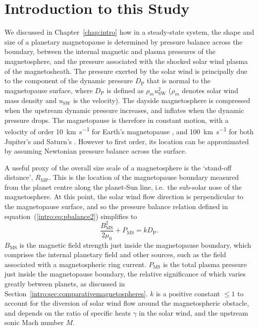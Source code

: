 \section{Introduction to this Study}\label{compress:sec:intro}
We discussed in Chapter~\ref{chap:intro} how in a steady-state system, the shape and size of a planetary magnetopause is determined by pressure balance across the boundary, between the internal magnetic and plasma pressures of the magnetosphere, and the pressure associated with the shocked solar wind plasma of the magnetosheath. The pressure exerted by the solar wind is principally due to the component of the dynamic pressure $D_\mathrm{P}$ that is normal to the magnetopause surface, where $D_\mathrm{P}$ is defined as $\rho_mu_\mathrm{SW}^2$ ($\rho_m$ denotes solar wind mass density and $u_\mathrm{SW}$ is the velocity). The dayside magnetosphere is compressed when the upstream dynamic pressure increases, and inflates when the dynamic pressure drops. The magnetopause is therefore in constant motion, with a velocity of order {\SI{10}{km s^{-1}}} for Earth's magnetopause {\citep{berchem1982}}, and {\SI{100}{km s^{-1}}} for both Jupiter's \citep{bame1992} and Saturn's {\citep{masters2011}}. However to first order, its location can be approximated by assuming Newtonian pressure balance across the surface. 

A useful proxy of the overall size scale of a magnetosphere is the `stand-off distance', $R_\mathrm{MP}$. This is the location of the magnetopause boundary measured from the planet centre along the planet-Sun line, i.e.\ the sub-solar nose of the magnetosphere. At this point, the solar wind flow direction is perpendicular to the magnetopause surface, and so the pressure balance relation defined in equation~(\ref{intro:eq:pbalance2}) simplifies to
\begin{equation}\label{compress:eq:pbalance}
\frac{B_{\mathrm{MS}}^2}{2\mu_0} + P_{\mathrm{MS}} = kD_\mathrm{P}.
\end{equation}
$B_\mathrm{MS}$ is the magnetic field strength just inside the magnetopause boundary, which comprises the internal planetary field and other sources, such as the field associated with a magnetospheric ring current. $P_{\mathrm{MS}}$ is the total plasma pressure just inside the magnetopause boundary, the relative significance of which varies greatly between planets, as discussed in Section~\ref{intro:sec:comparativemagnetospheres}. $k$ is a positive constant $\leq1$ to account for the diversion of solar wind flow around the magnetospheric obstacle, and depends on the ratio of specific heats $\gamma$ in the solar wind, and the upstream sonic Mach number $M$. 


